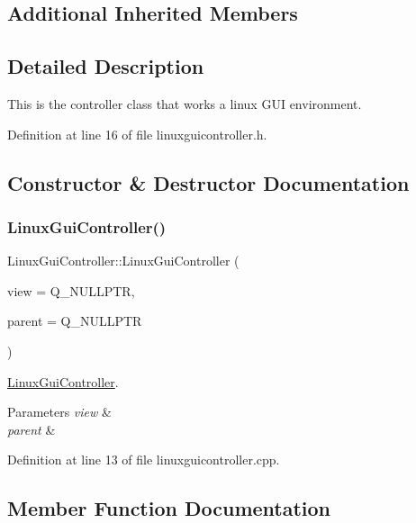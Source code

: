 \subsection*{Additional Inherited Members}


\subsection{Detailed Description}
This is the controller class that works a linux G\+UI environment. 

Definition at line 16 of file linuxguicontroller.\+h.



\subsection{Constructor \& Destructor Documentation}
\mbox{\label{classLinuxGuiController_a26b28a0d7854973830048c9087a3cdf1}} 
\subsubsection{\texorpdfstring{Linux\+Gui\+Controller()}{LinuxGuiController()}}
{\footnotesize\ttfamily Linux\+Gui\+Controller\+::\+Linux\+Gui\+Controller (\begin{DoxyParamCaption}\item[{Q\+Quick\+Window $\ast$}]{view = {\ttfamily Q\+\_\+NULLPTR},  }\item[{Q\+Object $\ast$}]{parent = {\ttfamily Q\+\_\+NULLPTR} }\end{DoxyParamCaption})}



\mbox{\hyperlink{classLinuxGuiController}{Linux\+Gui\+Controller}}. 


\begin{DoxyParams}{Parameters}
{\em view} & \\
\hline
{\em parent} & \\
\hline
\end{DoxyParams}


Definition at line 13 of file linuxguicontroller.\+cpp.



\subsection{Member Function Documentation}
\mbox{\label{classLinuxGuiController_a8242963a9c5f4b967902f8ee576294ec}} 
